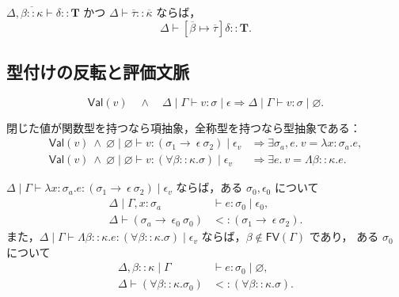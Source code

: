 \begin{lemma}[宣言型の具体化]
\label{lem:fxi-declaration-instantiation}
$\Delta,\overline{\beta::\kappa}\vdash
\delta::\mathbf{T}$ かつ
$\Delta\vdash\overline{\tau}::\overline{\kappa}$
ならば，
\[
  \Delta\vdash
    [\overline{\beta}\mapsto\overline{\tau}]
      \delta::\mathbf{T}.
\]
\end{lemma}

\subsection{型付けの反転と評価文脈}

\begin{lemma}[値の空効果]
\label{lem:fxi-value-pure}
\[
  \mathsf{Val}(v)
  \quad\land\quad
  \Delta\mid\Gamma\vdash v:\sigma\mid\epsilon
  \Longrightarrow
  \Delta\mid\Gamma\vdash v:\sigma\mid\varnothing.
\]
\end{lemma}

\begin{lemma}
\label{lem:fxi-canonical-forms}
閉じた値が関数型を持つなら項抽象，全称型を持つなら型抽象である：
\begin{align*}
  \mathsf{Val}(v)
  \ \land\
  \varnothing\mid\varnothing\vdash
    v:(\sigma_1\rightarrow~\epsilon~\sigma_2)
      \mid\epsilon_v
  &\Longrightarrow
    \exists\sigma_a,e.\ v=\lambda x:\sigma_a.e,\\
  \mathsf{Val}(v)
  \ \land\
  \varnothing\mid\varnothing\vdash
    v:(\forall\beta::\kappa.\sigma)
      \mid\epsilon_v
  &\Longrightarrow
    \exists e.\ v=\Lambda\beta::\kappa.e.
\end{align*}
\end{lemma}

\begin{lemma}[抽象の型付けの反転]
\label{lem:fxi-abstraction-inversion}
$\Delta\mid\Gamma\vdash
\lambda x:\sigma_a.e:
(\sigma_1\rightarrow~\epsilon~\sigma_2)\mid\epsilon_v$
ならば，ある $\sigma_0,\epsilon_0$ について
\[
  \begin{aligned}
    \Delta\mid\Gamma,x:\sigma_a
      &\vdash e:\sigma_0\mid\epsilon_0,\\
    \Delta\vdash
      (\sigma_a\rightarrow~\epsilon_0~\sigma_0)
      &<: (\sigma_1\rightarrow~\epsilon~\sigma_2).
  \end{aligned}
\]
また，$\Delta\mid\Gamma\vdash
\Lambda\beta::\kappa.e:
(\forall\beta::\kappa.\sigma)\mid\epsilon_v$
ならば，$\beta\notin\mathsf{FV}(\Gamma)$ であり，
ある $\sigma_0$ について
\[
  \begin{aligned}
    \Delta,\beta::\kappa\mid\Gamma
      &\vdash e:\sigma_0\mid\varnothing,\\
    \Delta\vdash
      (\forall\beta::\kappa.\sigma_0)
      &<: (\forall\beta::\kappa.\sigma).
  \end{aligned}
\]
\end{lemma}

